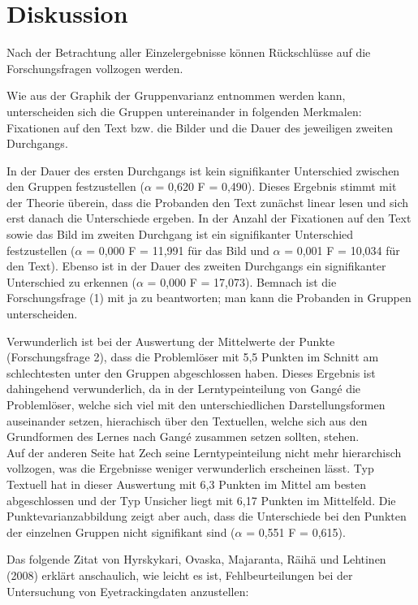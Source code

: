 \chapter{Diskussion}

Nach der Betrachtung aller Einzelergebnisse können Rückschlüsse auf die Forschungsfragen vollzogen werden.  

Wie aus der Graphik der Gruppenvarianz entnommen werden kann, unterscheiden sich die Gruppen untereinander in folgenden Merkmalen: Fixationen auf den Text bzw. die Bilder und die Dauer des jeweiligen zweiten Durchgangs.

In der Dauer des ersten Durchgangs ist kein signifikanter Unterschied zwischen den Gruppen festzustellen ($\alpha$ = 0,620 F = 0,490). Dieses Ergebnis stimmt mit der Theorie überein, dass die Probanden den Text zunächst linear lesen und sich erst danach die Unterschiede ergeben. In der Anzahl der Fixationen auf den Text sowie das Bild im zweiten Durchgang ist ein signifikanter Unterschied festzustellen ($\alpha$ = 0,000 F = 11,991 für das Bild und $\alpha$ = 0,001 F = 10,034 für den Text). Ebenso ist in der Dauer des zweiten Durchgangs ein signifikanter Unterschied zu erkennen ($\alpha$ = 0,000 F = 17,073). Bemnach ist die Forschungsfrage (1) mit ja zu beantworten; man kann die Probanden in Gruppen unterscheiden.

Verwunderlich ist bei der Auswertung der Mittelwerte der Punkte (Forschungsfrage 2), dass die Problemlöser mit 5,5 Punkten im Schnitt am schlechtesten unter den Gruppen abgeschlossen haben. Dieses Ergebnis ist dahingehend verwunderlich, da in der Lerntypeinteilung von Gangé die Problemlöser, welche sich viel mit den unterschiedlichen Darstellungsformen auseinander setzen, hierachisch über den Textuellen, welche sich aus den Grundformen des Lernes nach Gangé zusammen setzen sollten, stehen. \\
Auf der anderen Seite hat Zech seine Lerntypeinteilung nicht mehr hierarchisch vollzogen, was die Ergebnisse weniger verwunderlich erscheinen lässt. Typ Textuell hat in dieser Auswertung mit 6,3 Punkten im Mittel am besten abgeschlossen und der Typ Unsicher liegt mit 6,17 Punkten im Mittelfeld. Die Punktevarianzabbildung zeigt aber auch, dass die Unterschiede bei den Punkten der einzelnen Gruppen nicht signifikant sind ($\alpha$ = 0,551 F = 0,615). 

Das folgende Zitat von Hyrskykari, Ovaska, Majaranta, Räihä und Lehtinen (2008) erklärt anschaulich, wie leicht es ist, Fehlbeurteilungen bei der Untersuchung von Eyetrackingdaten anzustellen:

